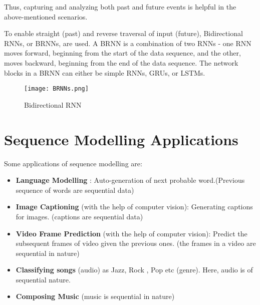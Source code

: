 Thus, capturing and analyzing both past and future events is helpful in the above-mentioned scenarios.

To enable straight (past) and reverse traversal of input (future), Bidirectional RNNs, or BRNNs, are used. A BRNN is a combination of two RNNs - one RNN moves forward, beginning from the start of the data sequence, and the other, moves backward, beginning from the end of the data sequence. The network blocks in a BRNN can either be simple RNNs, GRUs, or LSTMs.

\begin{figure}[H]
    \centering
    \texttt{[image: BRNNs.png]}
    \caption{Bidirectional RNN}
    \label{fig:BRNN}
\end{figure}

\section{Sequence Modelling Applications}
Some applications of sequence modelling are:
\begin{itemize}
    \item \textbf{Language Modelling} : Auto-generation of next probable word.(Previous sequence of words are sequential data)
    \item \textbf{Image Captioning} (with the help of computer vision): Generating captions for images. (captions are sequential data)
    \item \textbf{Video Frame Prediction} (with the help of computer vision): Predict the subsequent frames of video given the previous ones. (the frames in a video are sequential in nature)
    \item \textbf{Classifying songs} (audio) as Jazz, Rock , Pop etc (genre). Here, audio is of sequential nature.
    \item \textbf{Composing Music} (music is sequential in nature)
\end{itemize}



